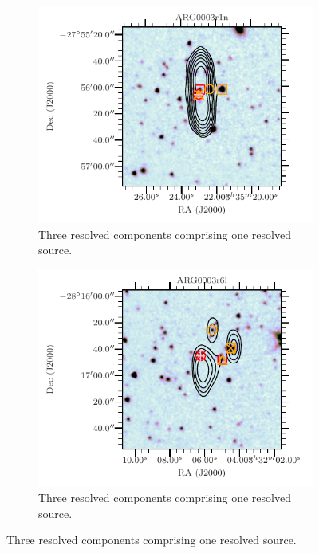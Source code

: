 \begin{figure}
        \begin{subfigure}{0.45\textwidth}
            \includegraphics[width=\textwidth]{atlas-images/examples_all/example_sorted_3_454.pdf}
            \caption{Three resolved components comprising one resolved source.}
        \end{subfigure}
        \begin{subfigure}{0.45\textwidth}
            \includegraphics[width=\textwidth]{atlas-images/examples_all/example_sorted_4_264.pdf}
            \caption{Three resolved components comprising one resolved source.}
        \end{subfigure}

\end{figure}
